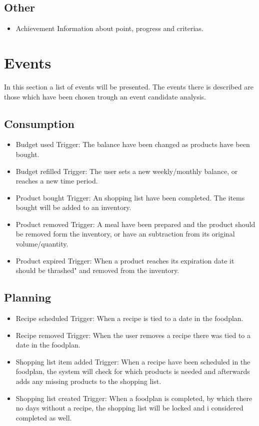 \subsection{Other}
\begin{itemize}
\item Achievement
	\subitem Information about point, progress and criterias. %
\end{itemize}

\section{Events}
In this section a list of events will be presented. The events there is described are those which have been chosen trough an event candidate analysis.
\subsection{Consumption}
\begin{itemize}
\item Budget used
	\subitem Trigger: The balance have been changed as products have been bought.
\item Budget refilled
	\subitem Trigger: The user sets a new weekly/monthly balance, or reaches a new time period.
\item Product bought
	\subitem Trigger: An shopping list have been completed. The items bought will be added to an inventory.
\item Product removed
	\subitem Trigger: A meal have been prepared and the product should be removed form the inventory, or have an subtraction from its original volume/quantity.
\item Product expired
	\subitem Trigger: When a product reaches its expiration date it should be thrashed" and removed from the inventory.
\end{itemize}

\subsection{Planning}
\begin{itemize}
\item Recipe scheduled
	\subitem Trigger: When a recipe is tied to a date in the foodplan.
\item Recipe removed
	\subitem Trigger: When the user removes a recipe there was tied to a date in the foodplan.
\item Shopping list item added
	\subitem Trigger: When a recipe have been scheduled in the foodplan, the system will check for which products is needed and afterwards adds any missing products to the shopping list.
\item Shopping list created
	\subitem Trigger: When a foodplan is completed, by which there no days without a recipe, the shopping list will be locked and i considered completed as well.
\end{itemize}


